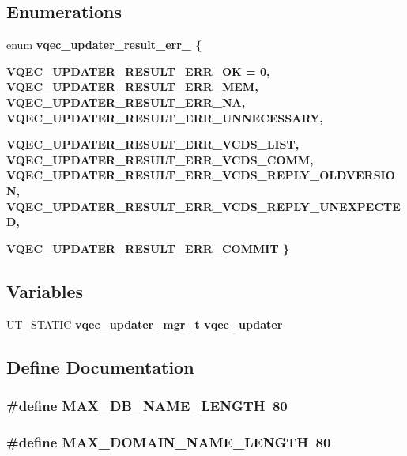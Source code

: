 \subsection*{Enumerations}
\begin{CompactItemize}
\item 
enum \bf{vqec\_\-updater\_\-result\_\-err\_\-} \{ \par
\bf{VQEC\_\-UPDATER\_\-RESULT\_\-ERR\_\-OK} =  0, 
\bf{VQEC\_\-UPDATER\_\-RESULT\_\-ERR\_\-MEM}, 
\bf{VQEC\_\-UPDATER\_\-RESULT\_\-ERR\_\-NA}, 
\bf{VQEC\_\-UPDATER\_\-RESULT\_\-ERR\_\-UNNECESSARY}, 
\par
\bf{VQEC\_\-UPDATER\_\-RESULT\_\-ERR\_\-VCDS\_\-LIST}, 
\bf{VQEC\_\-UPDATER\_\-RESULT\_\-ERR\_\-VCDS\_\-COMM}, 
\bf{VQEC\_\-UPDATER\_\-RESULT\_\-ERR\_\-VCDS\_\-REPLY\_\-OLDVERSION}, 
\bf{VQEC\_\-UPDATER\_\-RESULT\_\-ERR\_\-VCDS\_\-REPLY\_\-UNEXPECTED}, 
\par
\bf{VQEC\_\-UPDATER\_\-RESULT\_\-ERR\_\-COMMIT}
 \}
\end{CompactItemize}
\subsection*{Variables}
\begin{CompactItemize}
\item 
UT\_\-STATIC \bf{vqec\_\-updater\_\-mgr\_\-t} \bf{vqec\_\-updater}
\end{CompactItemize}


\subsection{Define Documentation}
\subsubsection{\setlength{\rightskip}{0pt plus 5cm}\#define MAX\_\-DB\_\-NAME\_\-LENGTH~80}\label{vqec__updater__private_8h_3aa10045e3dfa3194539350c2e8bad0d}


\subsubsection{\setlength{\rightskip}{0pt plus 5cm}\#define MAX\_\-DOMAIN\_\-NAME\_\-LENGTH~80}\label{vqec__updater__private_8h_6203ee0e41a954b6acdfdd6cc5ae5af6}


